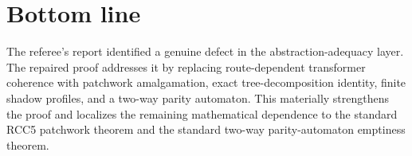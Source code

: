 \documentclass[11pt]{article}
\begin{document}
\section*{Bottom line}

The referee's report identified a genuine defect in the abstraction-adequacy layer.  The
repaired proof addresses it by replacing route-dependent transformer coherence with
patchwork amalgamation, exact tree-decomposition identity, finite shadow profiles, and a
two-way parity automaton.  This materially strengthens the proof and localizes the
remaining mathematical dependence to the standard RCC5 patchwork theorem and the standard
two-way parity-automaton emptiness theorem.
\end{document}

